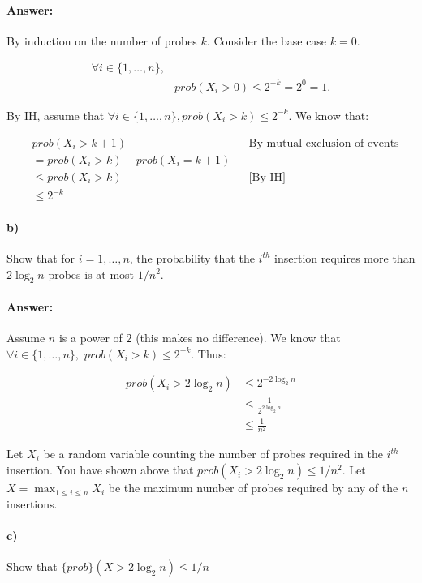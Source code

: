 \documentclass[a4paper]{article}
\begin{document}
\paragraph{Answer:}

By induction on the number of probes $k$. Consider the base case $k=0$.


\begin{align*}
\forall i \in \{1, \ldots, n\}, \\
& {prob}(X_i > 0) \le 2^{-k} = 2^0 = 1.
\end{align*}

By IH, assume that $\forall i \in \{1, \ldots, n\}, {prob}(X_i > k) \le 2^{-k}$. We know that:

\begin{align*}
& {prob}(X_i > k+1) && \text{By mutual exclusion of events} \\
& = {prob}(X_i > k) - {prob}(X_i = k+1) \\
& \le {prob}(X_i > k) && \text{[By IH]} \\
& \le 2^{-k}
\end{align*}

\paragraph{b)} Show that for $i = 1, \ldots, n$, the probability that the $i^{th}$ insertion requires more than $2 \log_2 n$ probes is at most $1/n^2$.

\paragraph{Answer:}

Assume $n$ is a power of $2$ (this makes no difference). We know that $\forall i \in \{1, \ldots, n\},$
${prob}(X_i > k) \le 2^{-k}$. Thus:

\begin{align*}
{prob}(X_i > 2 \log_2 n) & \le 2^{-2\log_2 n} \\
& \le \frac{1}{2^{2 \log_2 n}} \\
& \le \frac{1}{n^2}
\end{align*}


\noindent Let $X_i$ be a random variable counting the number of probes required in the $i^{th}$ insertion. You have shown above that ${prob}(X_i > 2 \log_2 n) \le 1/n^2$. Let $X = \max_{1 \le i \le n} X_i$ be the maximum number of probes required by any of the $n$ insertions.


\paragraph{c)} Show that $\{prob\}(X > 2 \log_2 n) \le 1/n$
\end{document}
